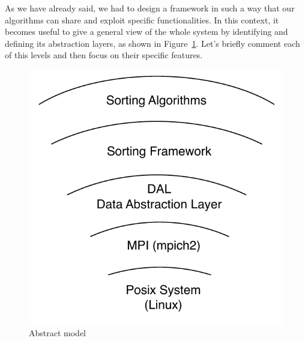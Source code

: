 \label{fram-intr}
As we have already said, we had to design a framework in such a way that our algorithms can share and exploit specific functionalities. In this context, it becomes useful to give a general view of the whole system by identifying and defining its abstraction layers, as shown in Figure~\ref{levels}. Let's briefly comment each of this levels and then focus on their specific features.
\begin{figure}[h]
  \begin{center}
    \includegraphics[scale=0.60]{levels}
  \end{center} 
  \caption{Abstract model}
  \label{levels}
\end{figure}
